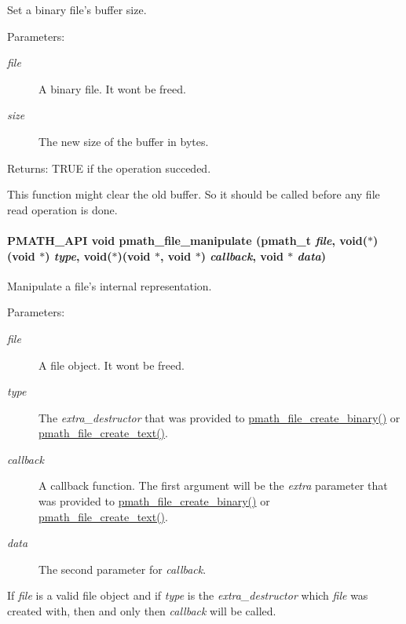 Set a binary file's buffer size. 

\begin{Desc}
\item[Parameters:]
\begin{description}
\item[{\em file}]A binary file. It wont be freed. \item[{\em size}]The new size of the buffer in bytes. \end{description}
\end{Desc}
\begin{Desc}
\item[Returns:]TRUE if the operation succeded.\end{Desc}
This function might clear the old buffer. So it should be called before any file read operation is done. \hypertarget{group__file__api_ga286dc02f8ee28ee0b3fcfa302ae7982}{
\paragraph[{pmath\_\-file\_\-manipulate}]{\setlength{\rightskip}{0pt plus 5cm}PMATH\_\-API void pmath\_\-file\_\-manipulate ({\bf pmath\_\-t} {\em file}, \/  void($\ast$)(void $\ast$) {\em type}, \/  void($\ast$)(void $\ast$, void $\ast$) {\em callback}, \/  void $\ast$ {\em data})}\hfill}
\label{group__file__api_ga286dc02f8ee28ee0b3fcfa302ae7982}


Manipulate a file's internal representation. 

\begin{Desc}
\item[Parameters:]
\begin{description}
\item[{\em file}]A file object. It wont be freed. \item[{\em type}]The {\em extra\_\-destructor\/} that was provided to \hyperlink{group__file__api_g121e1c31d32fa30b60c8bb4d0808f4eb}{pmath\_\-file\_\-create\_\-binary()} or \hyperlink{group__file__api_gb8a4394b083543a3e572862d567b4b63}{pmath\_\-file\_\-create\_\-text()}. \item[{\em callback}]A callback function. The first argument will be the {\em extra\/} parameter that was provided to \hyperlink{group__file__api_g121e1c31d32fa30b60c8bb4d0808f4eb}{pmath\_\-file\_\-create\_\-binary()} or \hyperlink{group__file__api_gb8a4394b083543a3e572862d567b4b63}{pmath\_\-file\_\-create\_\-text()}. \item[{\em data}]The second parameter for {\em callback\/}.\end{description}
\end{Desc}
If {\em file\/} is a valid file object and if {\em type\/} is the {\em extra\_\-destructor\/} which {\em file\/} was created with, then and only then {\em callback\/} will be called.

